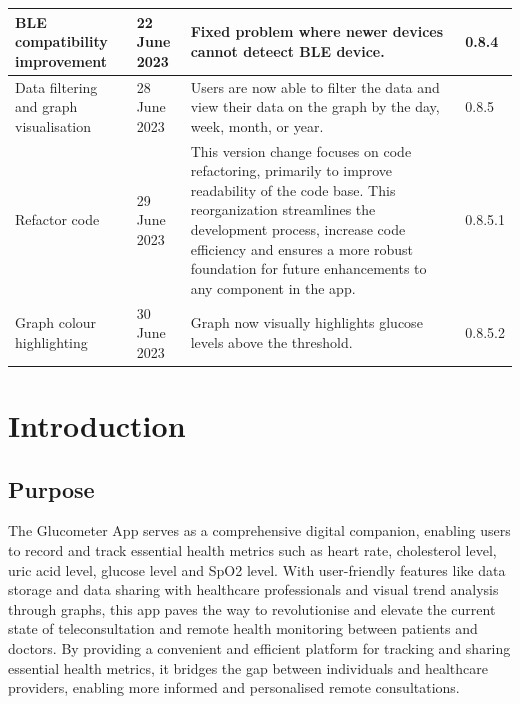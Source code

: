 \documentclass[a4paper]{scrreprt}
\begin{document}
\begin{center}
\begin{longtable}{|p{2.8cm}|l|p{7cm}|l|}
    \hline
    BLE compatibility improvement & 22 June 2023 & Fixed problem where newer devices cannot deteect BLE device. & 0.8.4\\
    \hline
    Data filtering and graph visualisation & 28 June 2023 & Users are now able to filter the data and view their data on the graph by the day, week, month, or year. & 0.8.5\\
    \hline
    Refactor code & 29 June 2023 & This version change focuses on code refactoring, primarily to improve readability of the code base. This reorganization streamlines the development process, increase code efficiency and ensures a more robust foundation for future enhancements to any component in the app. & 0.8.5.1\\
    \hline
    Graph colour highlighting & 30 June 2023 & Graph now visually highlights glucose levels above the threshold. & 0.8.5.2\\
    \hline
\end{longtable}
\end{center}


\tableofcontents


\chapter{Introduction}

\section{Purpose}
The Glucometer App serves as a comprehensive digital companion, enabling users to record and track essential health metrics such as heart rate, cholesterol level, uric acid level, glucose level and SpO2 level.
\newline
With user-friendly features like data storage and data sharing with healthcare professionals and visual trend analysis through graphs, this app paves the way to revolutionise and elevate the current state of teleconsultation and remote health monitoring between patients and doctors.
\newline
By providing a convenient and efficient platform for tracking and sharing essential health metrics, it bridges the gap between individuals and healthcare providers, enabling more informed and personalised remote consultations.
\end{document}
